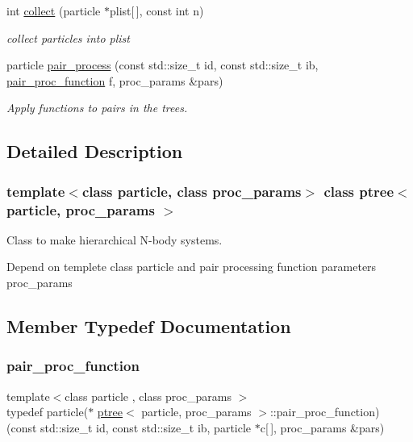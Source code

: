 \begin{DoxyCompactItemize}
int \hyperlink{classptree_a84576b8523ff7b4f90711fd18e6d0e22}{collect} (particle $\ast$plist\mbox{[}$\,$\mbox{]}, const int n)
\begin{DoxyCompactList}\small\item\em collect particles into plist \end{DoxyCompactList}\item 
particle \hyperlink{classptree_ac8d6f27b2accf46a78dd865093af7849}{pair\+\_\+process} (const std\+::size\+\_\+t id, const std\+::size\+\_\+t ib, \hyperlink{classptree_a5dce5bec8c21e2bfb68446434e95d21a}{pair\+\_\+proc\+\_\+function} f, proc\+\_\+params \&pars)
\begin{DoxyCompactList}\small\item\em Apply functions to pairs in the trees. \end{DoxyCompactList}\end{DoxyCompactItemize}


\subsection{Detailed Description}
\subsubsection*{template$<$class particle, class proc\+\_\+params$>$\newline
class ptree$<$ particle, proc\+\_\+params $>$}

Class to make hierarchical N-\/body systems. 

Depend on templete class particle and pair processing function parameters proc\+\_\+params 

\subsection{Member Typedef Documentation}
\hypertarget{classptree_a5dce5bec8c21e2bfb68446434e95d21a}{}\label{classptree_a5dce5bec8c21e2bfb68446434e95d21a} 
\subsubsection{\texorpdfstring{pair\+\_\+proc\+\_\+function}{pair\_proc\_function}}
{\footnotesize\ttfamily template$<$class particle , class proc\+\_\+params $>$ \\
typedef particle($\ast$ \hyperlink{classptree}{ptree}$<$ particle, proc\+\_\+params $>$\+::pair\+\_\+proc\+\_\+function) (const std\+::size\+\_\+t id, const std\+::size\+\_\+t ib, particle $\ast$c\mbox{[}$\,$\mbox{]}, proc\+\_\+params \&pars)}



